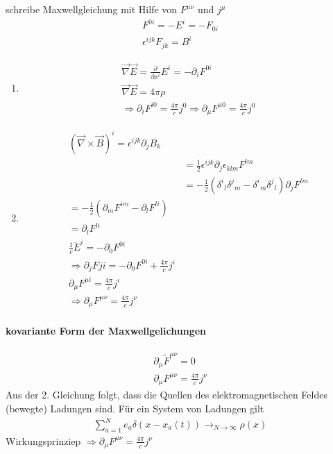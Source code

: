 \documentclass[a4paper]{article}
\begin{document}
schreibe Maxwellgleichung mit Hilfe von $F^{\mu\nu}$ und $j^\mu$
\begin{align}
F^{0i}=-E^i=-F_{0i}\\
\epsilon^{ijk}F_{jk}=B^i
\end{align}
\begin{enumerate}
  \item \begin{align}
  \vec{\nabla}\vec{E}=\frac{\partial}{\partial x^i}E^i=-\partial_i F^{0i}\\
  \vec{\nabla}\vec{E}=4\pi\rho\\
  \Rightarrow \partial_iF^{i0}=\frac{4\pi}{c}j^0
  \Rightarrow \partial_\mu F^{\mu0}=\frac{4\pi}{c}j^0
  \end{align}
  \item \begin{align}
  (\vec{\nabla}\times\vec{B})^i=\epsilon^{ijk}\partial_jB_k\\
  &=\frac{1}{2}\epsilon^{ijk}\partial_j\epsilon_{klm}F^{lm}\\
  &=-\frac{1}{2}\left(\delta^i{}_l \delta^j{}_m -
  \delta^i{}_m \delta^j{}_l \right) \partial_jF^{lm}\\
  =-\frac{1}{2}\left(\partial_mF^{im}- \partial_lF^{li}\right)\\
  =  \partial_l F^{li}\\
  \frac{1}{c}\ddot{E}^i=-\partial_0F^{0i}\\
  \Rightarrow \partial_j F{ji}=-\partial_0F^{0i}+\frac{4\pi}{c}j^i\\
  \partial_\mu F^{\mu i}=\frac{4\pi}{c}j^i\\
  \Rightarrow \partial_\mu F^{\mu \nu}=\frac{4\pi}{c}j^\nu
  \end{align}
\end{enumerate}
\paragraph{kovariante Form der Maxwellgelichungen}
\begin{align}
\partial_\mu\tilde{F}^{\mu\nu}=0\\
\partial_\mu F^{\mu \nu}=\frac{4\pi}{c}j^\nu
\end{align}
Aus der 2. Gleichung folgt, dass die Quellen des elektromagnetischen Feldes
(bewegte) Ladungen sind.
Für ein System von Ladungen gilt
\begin{align}
\sum_{a=1}^N e_a \delta(x-x_a(t))\rightarrow_{N\rightarrow\infty}\rho(x)
\end{align} 
Wirkungsprinziep $\Rightarrow \partial_\mu F^{\mu \nu}=\frac{4\pi}{c}j^\nu$\\
\end{document}

